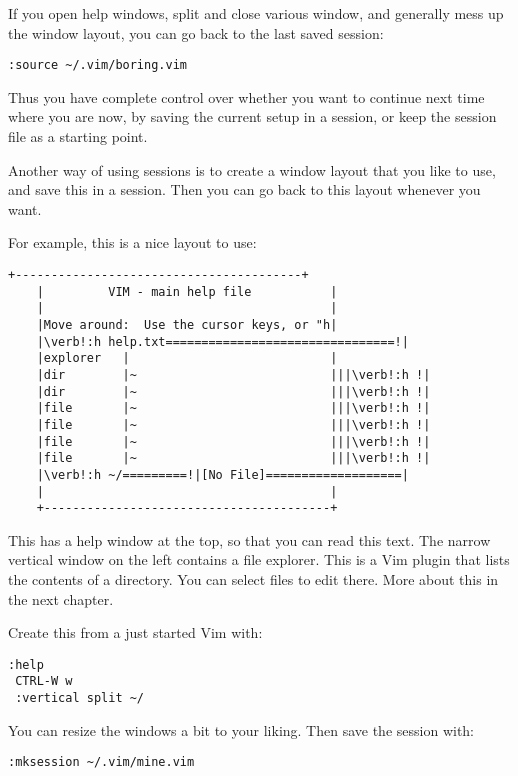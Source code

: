 If you open help windows, split and close various window, and generally mess up the window layout, you can go back to the last saved session:

\begin{Verbatim}[samepage=true]
 :source ~/.vim/boring.vim
\end{Verbatim}

Thus you have complete control over whether you want to continue next time where you are now, by saving the current setup in a session, or keep the session file as a starting point.

Another way of using sessions is to create a window layout that you like to use, and save this in a session.
Then you can go back to this layout whenever you want.

For example, this is a nice layout to use:

\begin{Verbatim}[samepage=true]
    +----------------------------------------+
    |         VIM - main help file           |
    |                                        |
    |Move around:  Use the cursor keys, or "h|
    |\verb!:h help.txt================================!|
    |explorer   |                            |
    |dir        |~                           |||\verb!:h !|
    |dir        |~                           |||\verb!:h !|
    |file       |~                           |||\verb!:h !|
    |file       |~                           |||\verb!:h !|
    |file       |~                           |||\verb!:h !|
    |file       |~                           |||\verb!:h !|
    |\verb!:h ~/=========!|[No File]===================|
    |                                        |
    +----------------------------------------+
\end{Verbatim}

This has a help window at the top, so that you can read this text.
The narrow vertical window on the left contains a file explorer.
This is a Vim plugin that lists the contents of a directory.
You can select files to edit there.
More about this in the next chapter.

Create this from a just started Vim with:

\begin{Verbatim}[samepage=true]
 :help
 CTRL-W w
 :vertical split ~/
\end{Verbatim}

You can resize the windows a bit to your liking.
Then save the session with:

\begin{Verbatim}[samepage=true]
 :mksession ~/.vim/mine.vim
\end{Verbatim}

